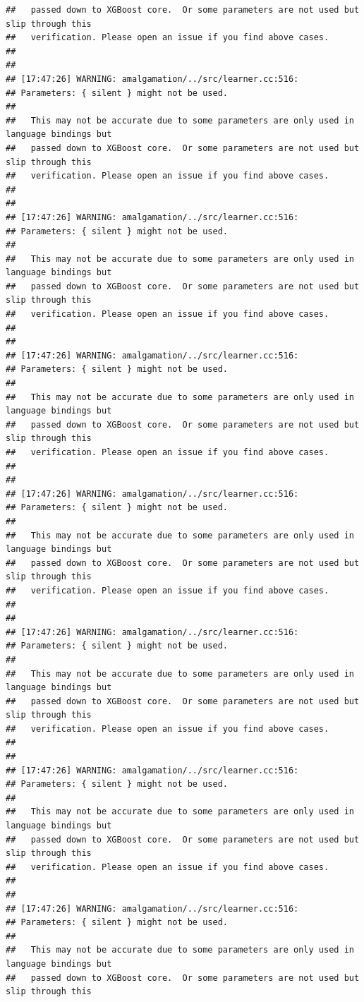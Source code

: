 \documentclass[AMS,STIX2COL]{WileyNJD-v2}\usepackage[]{graphicx}\usepackage[]{color}
\makeatletter
\newenvironment{kframe}{%
 \def\at@end@of@kframe{}%
 \ifinner\ifhmode%
  \def\at@end@of@kframe{\end{minipage}}%
  \begin{minipage}{\columnwidth}%
 \fi\fi%
 \def\FrameCommand##1{\hskip\@totalleftmargin \hskip-\fboxsep
 \colorbox{shadecolor}{##1}\hskip-\fboxsep
     \hskip-\linewidth \hskip-\@totalleftmargin \hskip\columnwidth}%
 \MakeFramed {\advance\hsize-\width
   \@totalleftmargin\z@ \linewidth\hsize
   \@setminipage}}%
 {\par\unskip\endMakeFramed%
 \at@end@of@kframe}
\newenvironment{knitrout}{}{} %
\makeatother
\begin{document}
\begin{knitrout}
\begin{kframe}
\begin{verbatim}
##   passed down to XGBoost core.  Or some parameters are not used but slip through this
##   verification. Please open an issue if you find above cases.
## 
## 
## [17:47:26] WARNING: amalgamation/../src/learner.cc:516: 
## Parameters: { silent } might not be used.
## 
##   This may not be accurate due to some parameters are only used in language bindings but
##   passed down to XGBoost core.  Or some parameters are not used but slip through this
##   verification. Please open an issue if you find above cases.
## 
## 
## [17:47:26] WARNING: amalgamation/../src/learner.cc:516: 
## Parameters: { silent } might not be used.
## 
##   This may not be accurate due to some parameters are only used in language bindings but
##   passed down to XGBoost core.  Or some parameters are not used but slip through this
##   verification. Please open an issue if you find above cases.
## 
## 
## [17:47:26] WARNING: amalgamation/../src/learner.cc:516: 
## Parameters: { silent } might not be used.
## 
##   This may not be accurate due to some parameters are only used in language bindings but
##   passed down to XGBoost core.  Or some parameters are not used but slip through this
##   verification. Please open an issue if you find above cases.
## 
## 
## [17:47:26] WARNING: amalgamation/../src/learner.cc:516: 
## Parameters: { silent } might not be used.
## 
##   This may not be accurate due to some parameters are only used in language bindings but
##   passed down to XGBoost core.  Or some parameters are not used but slip through this
##   verification. Please open an issue if you find above cases.
## 
## 
## [17:47:26] WARNING: amalgamation/../src/learner.cc:516: 
## Parameters: { silent } might not be used.
## 
##   This may not be accurate due to some parameters are only used in language bindings but
##   passed down to XGBoost core.  Or some parameters are not used but slip through this
##   verification. Please open an issue if you find above cases.
## 
## 
## [17:47:26] WARNING: amalgamation/../src/learner.cc:516: 
## Parameters: { silent } might not be used.
## 
##   This may not be accurate due to some parameters are only used in language bindings but
##   passed down to XGBoost core.  Or some parameters are not used but slip through this
##   verification. Please open an issue if you find above cases.
## 
## 
## [17:47:26] WARNING: amalgamation/../src/learner.cc:516: 
## Parameters: { silent } might not be used.
## 
##   This may not be accurate due to some parameters are only used in language bindings but
##   passed down to XGBoost core.  Or some parameters are not used but slip through this

\end{verbatim}
\end{kframe}
\end{knitrout}
\end{document}
